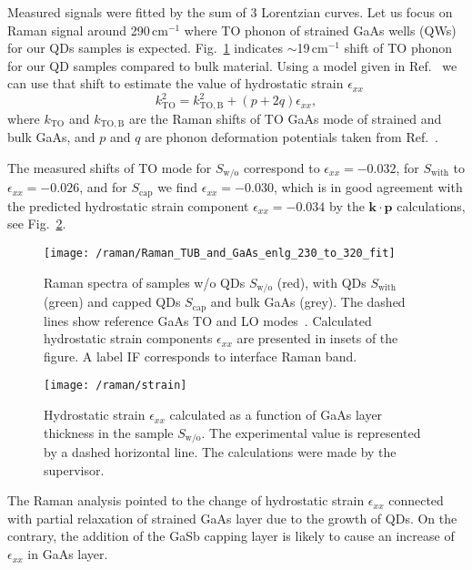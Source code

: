Measured signals were fitted by the sum of 3 Lorentzian curves.
Let us focus on Raman signal around 290$\,$cm$^{-1}$ where TO phonon of strained GaAs wells (QWs) for our QDs samples is expected. Fig.~\ref{fig:raman} indicates $\sim$19$\,$cm$^{-1}$ shift of TO phonon for our QD samples compared to bulk material. Using a model given in Ref.~\cite{Montazeri_Nano2010} we can use that shift to estimate the value of hydrostatic strain $\epsilon_{xx}$ 
\begin{equation}
k_\mathrm{TO}^2 = k_\mathrm{TO,B}^2 + (p+2q)\epsilon_{xx},
\end{equation}
where $k_\mathrm{TO}$ and $k_\mathrm{TO,B}$ are the Raman shifts of TO GaAs mode of strained and bulk GaAs, and $p$ and $q$ are phonon deformation potentials taken from Ref.~\cite{Cerdeira_PRB1972}.

The measured shifts of TO mode for $S_\mathrm{w/o}$ correspond to $\epsilon_{xx}=-0.032$, for $S_\mathrm{with}$ to $\epsilon_{xx}=-0.026$,  and for $S_\mathrm{cap}$ we find $\epsilon_{xx}=-0.030$, which is in good agreement with the predicted hydrostatic strain component $\epsilon_{xx}=-0.034$ by the $\mathbf{k \cdot p}$ calculations, see Fig.~\ref{fig:raman_theory_wo}. %
\begin{figure}
	\centering
	\texttt{[image: /raman/Raman\_TUB\_and\_GaAs\_enlg\_230\_to\_320\_fit]}
	\caption{Raman spectra of samples w/o QDs $S_\mathrm{w/o}$ (red), with QDs $S_\mathrm{with}$ (green) and capped QDs $S_\mathrm{cap}$ and bulk GaAs (grey). The dashed lines show reference GaAs TO and LO modes~\citep{Esther_Nanotech2013}. Calculated hydrostatic strain components $\epsilon_{xx}$ are presented in insets of the figure. A label IF corresponds to interface Raman band.}
	\label{fig:raman}
\end{figure}

\begin{figure}
	\centering
	\texttt{[image: /raman/strain]}
	\caption{Hydrostatic strain $\epsilon_{xx}$ calculated as a function of GaAs layer thickness in the sample $S_\mathrm{w/o}$. The experimental value is represented by a dashed horizontal line. The calculations were made by the supervisor.}
	\label{fig:raman_theory_wo}
\end{figure}

The Raman analysis pointed to the change of hydrostatic strain $\epsilon_{xx}$ connected with partial relaxation of strained GaAs layer due to the growth of QDs. On the contrary, the addition of the GaSb capping layer is likely to cause an increase of $\epsilon_{xx}$ in GaAs layer.


